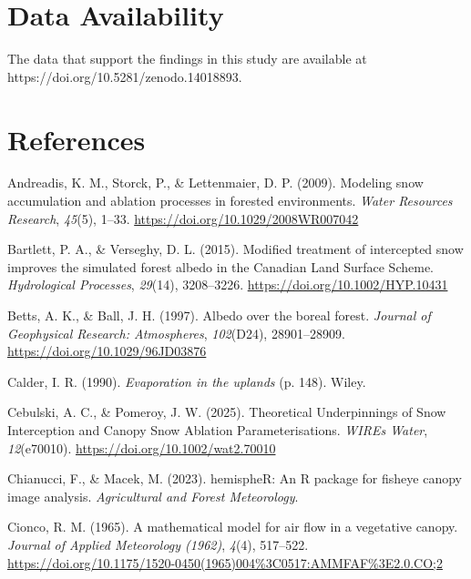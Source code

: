 \documentclass[
  letterpaper,
  DIV=11,
  numbers=noendperiod]{scrartcl}
\newlength{\cslhangindent}
\newenvironment{CSLReferences}[2] %
 {\begin{list}{}{%
  \setlength{\itemindent}{0pt}
  \setlength{\leftmargin}{0pt}
  \setlength{\parsep}{0pt}
  \ifodd #1
   \setlength{\leftmargin}{\cslhangindent}
   \setlength{\itemindent}{-1\cslhangindent}
  \fi
  \setlength{\itemsep}{#2\baselineskip}}}
 {\end{list}}
\begin{document}
\section{Data Availability}\label{data-availability}

The data that support the findings in this study are available at
https://doi.org/10.5281/zenodo.14018893.

\pagebreak

\section*{References}\label{references}

\label{refs}
\begin{CSLReferences}{1}{0}
Andreadis, K. M., Storck, P., \& Lettenmaier, D. P. (2009). Modeling
snow accumulation and ablation processes in forested environments.
\emph{Water Resources Research}, \emph{45}(5), 1--33.
\url{https://doi.org/10.1029/2008WR007042}

Bartlett, P. A., \& Verseghy, D. L. (2015). Modified treatment of
intercepted snow improves the simulated forest albedo in the {Canadian
Land Surface Scheme}. \emph{Hydrological Processes}, \emph{29}(14),
3208--3226. \url{https://doi.org/10.1002/HYP.10431}

Betts, A. K., \& Ball, J. H. (1997). Albedo over the boreal forest.
\emph{Journal of Geophysical Research: Atmospheres}, \emph{102}(D24),
28901--28909. \url{https://doi.org/10.1029/96JD03876}

Calder, I. R. (1990). \emph{Evaporation in the uplands} (p. 148). Wiley.

Cebulski, A. C., \& Pomeroy, J. W. (2025). Theoretical {Underpinnings}
of {Snow Interception} and {Canopy Snow Ablation Parameterisations}.
\emph{WIREs Water}, \emph{12}(e70010).
\url{https://doi.org/10.1002/wat2.70010}

Chianucci, F., \& Macek, M. (2023). {hemispheR}: An {R} package for
fisheye canopy image analysis. \emph{Agricultural and Forest
Meteorology}.

Cionco, R. M. (1965). A mathematical model for air flow in a vegetative
canopy. \emph{Journal of Applied Meteorology (1962)}, \emph{4}(4),
517--522.
\url{https://doi.org/10.1175/1520-0450(1965)004\%3C0517:AMMFAF\%3E2.0.CO;2}


\end{CSLReferences}
\end{document}
